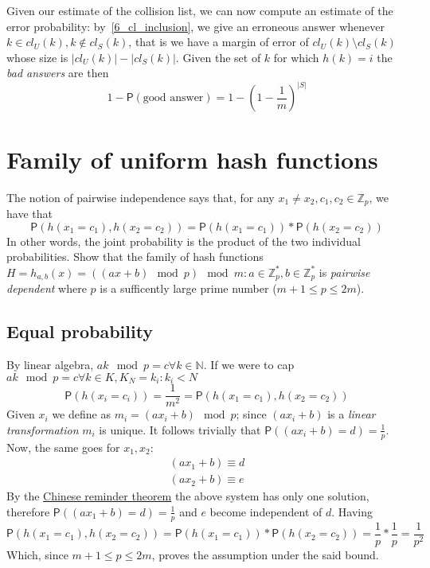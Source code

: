 \documentclass{article}
\newcommand*{\prob}{\mathsf{P}}     %
\begin{document}
Given our estimate of the collision list, we can now compute an estimate of the
error probability: by~\ref{6_cl_inclusion}, we give an erroneous answer whenever
$k \in cl_{U}(k), k \notin cl_{S}(k)$, that is we have a margin of error of
$cl_{U}(k) \setminus cl_{S}(k)$ whose size is $|cl_{U}(k)| - |cl_{S}(k)|$.
Given the set of $k$ for which $h(k) = i$ the \emph{bad answers} are then
    \begin{equation}
    1 - \prob(\textrm{good answer}) = 1 - {(1 - \frac{1}{m})}^{|S|}
    \end{equation}


\newpage
\section{Family of uniform hash functions}

The notion of pairwise independence says that, for any $x_{1} \neq x_{2}, c_{1}, c_{2}
\in \mathbb{Z}_{p}$, we have that
    \begin{equation}
    \prob(h(x_{1} = c_{1}), h(x_{2} = c_{2})) = \prob(h(x_{1} = c_{1})) * \prob(h(x_{2} = c_{2}))
    \end{equation}
In other words, the joint probability is the product of the two individual probabilities.
Show that the family of hash functions $H = {h_{a,b}(x) = ((ax + b) \mod p) \mod m}:
a \in \mathbb{Z}^{*}_{p},
b \in \mathbb{Z}^{*}_{p}$ is \emph{pairwise dependent}
where $p$ is a sufficently large prime number ($m + 1 \leq p \leq 2m$).

\subsection{Equal probability}

By linear algebra, $ak \mod p = c \forall k \in \mathbb{N}$.
If we were to cap $ak \mod p = c \forall k \in K, K_{N} = {k_{i}: k_{i} < N}$
\begin{equation}
\prob(h(x_{i} = c_{i})) = \frac{1}{m^{2}} = \prob(h(x_{1} = c_{1}), h(x_{2} = c_{2}))
\end{equation}
Given $x_{i}$ we define as $m_{i} = (a x_{i} + b) \mod p$; since $(a x_{i} + b)$
is a \emph{linear transformation} $m_{i}$ is unique.
It follows trivially that $\prob((a x_{i} + b) = d) = \frac{1}{p}$.
Now, the same goes for $x_{1}, x_{2}$:
    \begin{gather}
    (a x_{1} + b) \equiv d                                                           \\
    (a x_{2} + b) \equiv e
    \end{gather}
By the \href{http://en.wikipedia.org/wiki/Chinese_remainder_theorem}{Chinese reminder theorem}
the above system has only one solution, therefore $\prob((a x_{1} + b) = d) = \frac{1}{p}$ and
$e$ become independent of $d$.
Having
    \begin{equation}
    \prob(h(x_{1} = c_{1}), h(x_{2} = c_{2})) =
    \prob(h(x_{1} = c_{1})) * \prob(h(x_{2} = c_{2})) = \frac{1}{p} * \frac{1}{p} = \frac{1}{p^{2}}
    \end{equation}
Which, since $m + 1 \leq p \leq 2m$, proves the assumption under the said bound.
\end{document}
